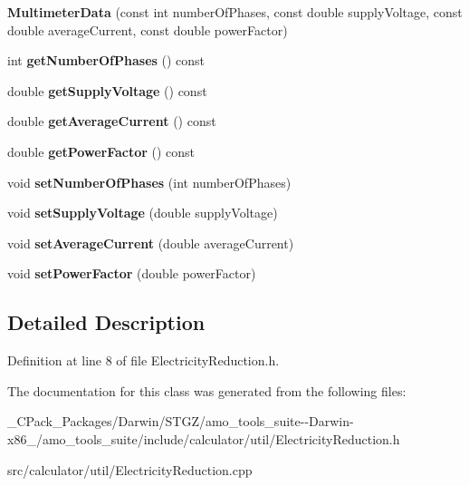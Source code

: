 \begin{DoxyCompactItemize}
{\bfseries Multimeter\+Data} (const int number\+Of\+Phases, const double supply\+Voltage, const double average\+Current, const double power\+Factor)
\item 
\mbox{\label{class_multimeter_data_ad254f94068e4a116a416aa5411415a7c}} 
int {\bfseries get\+Number\+Of\+Phases} () const
\item 
\mbox{\label{class_multimeter_data_a0a880bb110d60cbc681a9b696bf33d6c}} 
double {\bfseries get\+Supply\+Voltage} () const
\item 
\mbox{\label{class_multimeter_data_a45921cedcf2e730657f9a0fd7c1f9517}} 
double {\bfseries get\+Average\+Current} () const
\item 
\mbox{\label{class_multimeter_data_a5bd2f9e3fc4c0bcb88dddff2d9c93a8f}} 
double {\bfseries get\+Power\+Factor} () const
\item 
\mbox{\label{class_multimeter_data_a0fdfbdf0caf5cbdd8ce71db1fd229dda}} 
void {\bfseries set\+Number\+Of\+Phases} (int number\+Of\+Phases)
\item 
\mbox{\label{class_multimeter_data_a34fdca356ce74e92d8ae9128c39f76ff}} 
void {\bfseries set\+Supply\+Voltage} (double supply\+Voltage)
\item 
\mbox{\label{class_multimeter_data_a396eae0c1fb9b97372627585dc8475d8}} 
void {\bfseries set\+Average\+Current} (double average\+Current)
\item 
\mbox{\label{class_multimeter_data_a9d78c63369331a8a45ec24539e3f7bfb}} 
void {\bfseries set\+Power\+Factor} (double power\+Factor)
\end{DoxyCompactItemize}


\subsection{Detailed Description}


Definition at line 8 of file Electricity\+Reduction.\+h.



The documentation for this class was generated from the following files\+:\begin{DoxyCompactItemize}
\item 
\+\_\+\+C\+Pack\+\_\+\+Packages/\+Darwin/\+S\+T\+G\+Z/amo\+\_\+tools\+\_\+suite-\/-\/\+Darwin-\/x86\+\_/amo\+\_\+tools\+\_\+suite/include/calculator/util/Electricity\+Reduction.\+h\item 
src/calculator/util/Electricity\+Reduction.\+cpp\end{DoxyCompactItemize}
